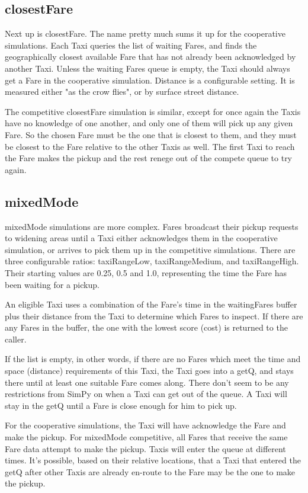 \documentclass[11pt,letterpaper,onecolumn,twoside,openright,draft]{report}
\begin{document}
\subsection{closestFare}
Next up is closestFare.
The name pretty much sums it up for the cooperative simulations.
Each Taxi queries the list of waiting Fares, and finds the geographically closest available Fare that has not already been acknowledged by another Taxi.
Unless the waiting Fares queue is empty, the Taxi should always get a Fare in the cooperative simulation.
Distance is a configurable setting.
It is measured either "as the crow flies", or by surface street distance.

The competitive closestFare simulation is similar, except for once again the Taxis have no knowledge of one another, and only one of them will pick up any given Fare.
So the chosen Fare must be the one that is closest to them, and they must be closest to the Fare relative to the other Taxis as well.
The first Taxi to reach the Fare makes the pickup and the rest renege out of the compete queue to try again.

\subsection{mixedMode}
mixedMode simulations are more complex.
Fares broadcast their pickup requests to widening areas until a Taxi either acknowledges them in the cooperative simulation, or arrives to pick them up in the competitive simulations.
There are three configurable ratios: taxiRangeLow, taxiRangeMedium, and taxiRangeHigh.
Their starting values are 0.25, 0.5 and 1.0, representing the time the Fare has been waiting for a pickup.

An eligible Taxi uses a combination of the Fare's time in the waitingFares buffer plus their distance from the Taxi to determine which Fares to inspect.
If there are any Fares in the buffer, the one with the lowest score (cost) is returned to the caller.

If the list is empty, in other words, if there are no Fares which meet the time and space (distance) requirements of this Taxi, the Taxi goes into a getQ, and stays there until at least one suitable Fare comes along.
There don't seem to be any restrictions from SimPy on when a Taxi can get out of the queue.
A Taxi will stay in the getQ until a Fare is close enough for him to pick up.

For the cooperative simulations, the Taxi will have acknowledge the Fare and make the pickup.
For mixedMode competitive, all Fares that receive the same Fare data attempt to make the pickup.
Taxis will enter the queue at different times.
It's possible, based on their relative locations, that a Taxi that entered the getQ after other Taxis are already en-route to the Fare may be the one to make the pickup.
\end{document}
